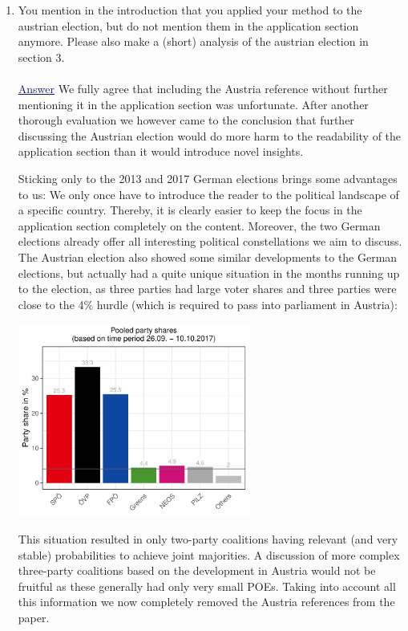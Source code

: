 \documentclass{scrartcl}
\newcommand{\blue}[1]{\textcolor{MidnightBlue}{\underline{\textcolor{MidnightBlue}{#1}}}}
\begin{document}
\begin{enumerate}
  \item You mention in the introduction that you applied your method to the austrian election, but do not mention them in the application section anymore. Please also make a (short) analysis of the austrian election in section 3.
  \\ \\
  \blue{Answer} We fully agree that including the Austria reference without further mentioning it in the application section was unfortunate. After another thorough evaluation we however came to the conclusion that further discussing the Austrian election would do more harm to the readability of the application section than it would introduce novel insights.\

Sticking only to the 2013 and 2017 German elections brings some advantages to us:
We only once have to introduce the reader to the political landscape of a specific country.
Thereby, it is clearly easier to keep the focus in the application section completely on the content.
Moreover, the two German elections already offer all interesting political constellations we aim to discuss. The Austrian election also showed some similar developments to the German elections, but actually had a quite unique situation in the months running up to the election, as three parties had large voter shares and three parties were close to the 4\% hurdle (which is required to pass into parliament in Austria):

\begin{center}
\includegraphics[width=0.6\textwidth]{figures/austria}
\end{center}

This situation resulted in only two-party coalitions having relevant (and very stable) probabilities to achieve joint majorities. A discussion of more complex three-party coalitions based on the development in Austria would not be fruitful as these generally had only very small POEs.
Taking into account all this information we now completely removed the Austria references from the paper.


\end{enumerate}
\end{document}
